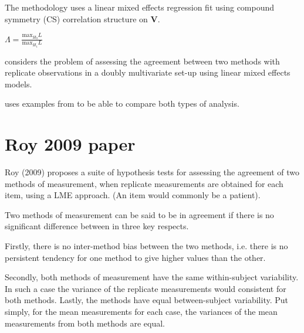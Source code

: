 \documentclass[12pt, a4paper]{report}
\theoremstyle{plain}
\theoremstyle{definition}
\theoremstyle{remark}
\begin{document}
		The methodology uses a linear mixed effects regression fit using
		compound symmetry (CS) correlation structure on \textbf{V}.
		
		
		$\Lambda = \frac{\mbox{max}_{H_{0}}L}{\mbox{max}_{H_{1}}L}$
		

	\citet{ARoy2009} considers the problem of assessing the agreement
	between two methods with replicate observations in a doubly
	multivariate set-up using linear mixed effects models.
	
	\citet{ARoy2009} uses examples from \citet{BA86} to be able to
	compare both types of analysis.
	

\section{Roy 2009 paper}

Roy (2009) proposes a suite of hypothesis tests for assessing the agreement of two methods of measurement, when replicate measurements are obtained for each item, using a LME approach. (An item would commonly be a patient).  

Two methods of measurement can be said to be in agreement if there is no significant difference between in three key respects. 

Firstly, there is no inter-method bias between the two methods, i.e. there is no persistent tendency for one method to give higher values than the other.

Secondly, both methods of measurement have the same  within-subject variability. In such a case the variance of the replicate measurements would consistent for both methods.
Lastly, the methods have equal between-subject variability.  Put simply, for the mean measurements for each case, the variances of the mean measurements from both methods are equal.
\end{document}
